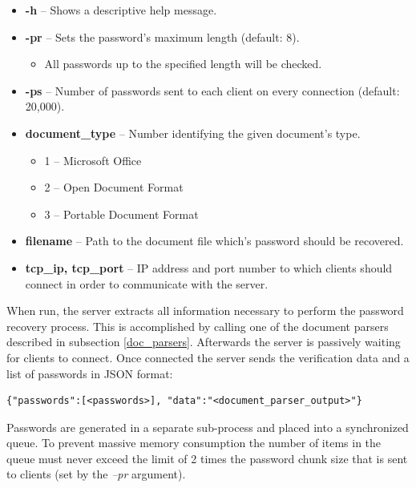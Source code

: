 \documentclass[11pt,oneside]{fithesis2}
\begin{document}
\begin{itemize}
\setlength\itemsep{0.1em}
	\item{\textbf{-h} -- Shows a descriptive help message.}
	\item{\textbf{-pr} -- Sets the password's maximum length (default: 8).}
		\begin{itemize}
		\setlength\itemsep{0.1em}
			\item{All passwords up to the specified length will be checked.}
		\end{itemize}
	\item{\textbf{-ps} -- Number of passwords sent to each client on every connection (default: 20,000).}
	\item{\textbf{document\_type} -- Number identifying the given document's type.}
		\begin{itemize}
		\setlength\itemsep{0.1em}
			\item{1 -- Microsoft Office}
			\item{2 -- Open Document Format}
			\item{3 -- Portable Document Format}
		\end{itemize}
	\item{\textbf{filename} -- Path to the document file which's password should be recovered.}
	\item{\textbf{tcp\_ip, tcp\_port} --  IP address and port number to which clients should connect in order to communicate with the server.}
\end{itemize}\label{server_params}

When run, the server extracts all information necessary to perform the password recovery process. This is accomplished by calling one of the document parsers described in subsection \ref{doc_parsers}. Afterwards the server is passively waiting for clients to connect. Once connected the server sends the verification data and a list of passwords in JSON \cite{rfc7159} format:

\begin{lstlisting} 
{"passwords":[<passwords>], "data":"<document_parser_output>"}
\end{lstlisting}\label{server_message}

Passwords are generated in a separate sub-process and placed into a synchronized queue. To prevent massive memory consumption the number of items in the queue must never exceed the limit of 2 times the password chunk size that is sent to clients (set by the \textit{–pr} argument).
\end{document}
